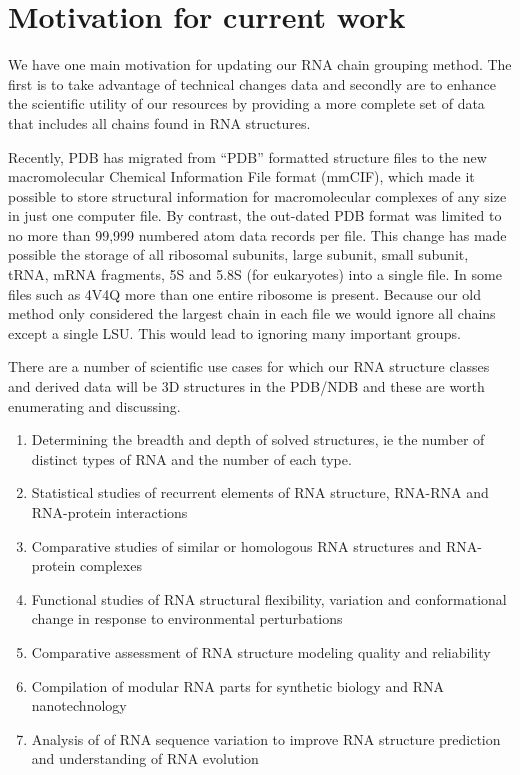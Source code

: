\section{Motivation for current work}

We have one main motivation for updating our RNA chain grouping method. The
first is to take advantage of technical changes data and secondly are to enhance
the scientific utility of our resources by providing a more complete set of data
that includes all chains found in RNA structures.

Recently,  PDB has migrated from “PDB” formatted structure files to the new
macromolecular Chemical Information File format (mmCIF), which made it possible
to store structural information for macromolecular complexes of any size in just
one computer file. By contrast, the out-dated PDB format was limited to no more
than 99,999 numbered atom data records per file. This change has made possible
the storage of all ribosomal subunits, large subunit, small subunit, tRNA, mRNA
fragments, 5S and 5.8S (for eukaryotes) into a single file. In some files such
as 4V4Q \cite{Schuwirth2005} more than one entire ribosome is present. Because
our old method only considered the largest chain in each file we would ignore
all chains except a single LSU. This would lead to ignoring many important
groups.

There are a number of scientific use cases for which our RNA structure classes
and derived data will be  3D structures in the PDB/NDB and these are worth
enumerating and discussing.

\begin{enumerate}
  \item Determining the breadth and depth of solved structures, ie the number of
    distinct types of RNA and the number of each type.

  \item Statistical studies of recurrent elements of RNA structure, RNA-RNA and
    RNA-protein interactions

  \item Comparative studies of similar or homologous RNA structures and
    RNA-protein complexes

  \item Functional studies of RNA structural flexibility, variation and
    conformational change in response to environmental perturbations

  \item Comparative assessment of RNA structure modeling quality and reliability

  \item Compilation of modular RNA parts for synthetic biology and RNA
    nanotechnology

  \item Analysis of  of RNA sequence variation to improve RNA structure
    prediction and understanding of RNA evolution
\end{enumerate}


